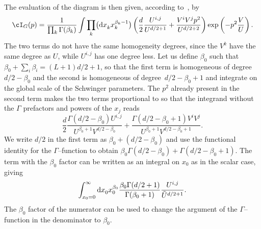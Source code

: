 The evaluation of the diagram is then given, according to~\cite{Na71}, by
\[%
	\cI_G(p) = \frac {1}{ \prod_k \Gamma(\beta_k)} \int \prod_k \bigl( {\rm d}x_k^{\vphantom {\beta_k}} x_k^{\beta_k-1}\bigr)
 		\left(\frac d2 \frac{U^{i,j}}{U^{d/2+1}} + \frac{V^i V^j p^2}{U^{d/2+2}} \right) \exp\left(-p^2 \frac V U\right).
\]
The two terms do not have the same homogeneity degrees, since the $V^k$ have the same degree as $U$, while $U^{i,j}$ has one degree less.
Let us define $\beta_0$ such that $\beta_0 + \sum_i \beta_i = (L+1)d/2 +1$, so that the first term is homogeneous of degree $d/2 - \beta_0$
and the second is homogeneous of degree~${d/2 - \beta_0 +1}$ and integrate on the global scale of the Schwinger parameters. The $p^2$ already present in the second term makes the two terms proportional to  so that the integrand without the $\Gamma$ prefactors and powers of the $x_j$ reads
\[%
 		\frac {d}2 \frac {\Gamma(d/2-\beta_0) U^{i,j}}{U^{\beta_0+1}V^{d/2-\beta_0}} + \frac{ \Gamma(d/2-\beta_0+1)V^i V^j}{U^{\beta_0+1}V^{d/2-\beta_0+1}} .
\]
We write $d/2$ in the first term as $\beta_0 + (d/2 - \beta_0)$ and use the functional identity for the $\Gamma$--function to obtain $\beta_0 \Gamma(d/2 - \beta_0) + \Gamma(d/2 - \beta_0 +1)$. The term with the $\beta_0$ factor can be written as an integral on $x_0$ as in the scalar case, giving
\begin{equation} \label{beta+1}
	\int_{x_0 =0}^\infty {\rm d}x_0 ^{\vphantom{\beta_0}} x_0 ^{\beta_0} \frac { \beta_0 \Gamma(d/2 + 1) }{\Gamma(\beta_0+1) } \frac { U^{i,j} } { \tilde U ^{d/2 +1} }.
\end{equation}
The $\beta_0$ factor of the numerator can be used to change the argument of the $\Gamma$--function in the denominator to $\beta_0$.

